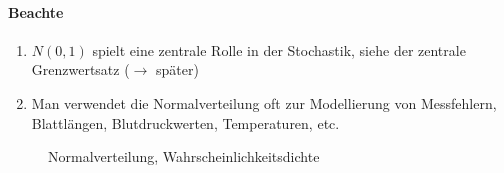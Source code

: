 \paragraph{Beachte}
\begin{enumerate}
    \item $N(0,1)$ spielt eine zentrale Rolle in der Stochastik, siehe der zentrale Grenzwertsatz ($\to$ später)
    \item Man verwendet die Normalverteilung oft zur Modellierung von Messfehlern, Blattlängen,
          Blutdruckwerten, Temperaturen, etc.
\end{enumerate}

\begin{figure}[H]
    \centering
    \caption{Normalverteilung, Wahrscheinlichkeitsdichte}
    \label{}
\end{figure}

